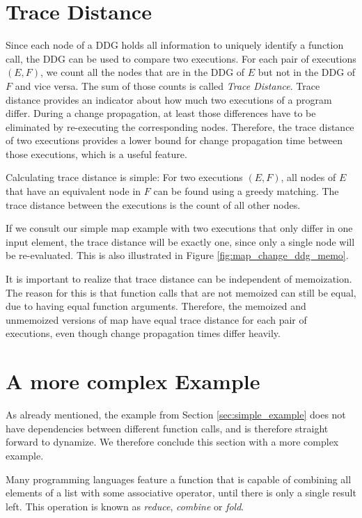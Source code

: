 \section{Trace Distance}
\label{sec:trace_distance}

Since each node of a DDG holds all information to uniquely identify a function call, the DDG can be used to compare two executions. For each pair of executions $(E, F)$, we count all the nodes that are in the DDG of $E$ but not in the DDG of $F$ and vice versa. The sum of those counts is called \textit{Trace Distance}. Trace distance provides an indicator about how much two executions of a program differ. During a change propagation, at least those differences have to be eliminated by re-executing the corresponding nodes. Therefore, the trace distance of two executions provides a lower bound for change propagation time between those executions, which is a useful feature. 

Calculating trace distance is simple: For two executions $(E, F)$, all nodes of $E$ that have an equivalent node in $F$ can be found using a greedy matching. The trace distance between the executions is the count of all other nodes. 

If we consult our simple map example with two executions that only differ in one input element, the trace distance will be exactly one, since only a single node will be re-evaluated. This is also illustrated in Figure \ref{fig:map_change_ddg_memo}.

It is important to realize that trace distance can be independent of memoization. The reason for this is that function calls that are not memoized can still be equal, due to having equal function arguments. Therefore, the memoized and unmemoized versions of map have equal trace distance for each pair of executions, even though change propagation times differ heavily.

\section{A more complex Example}
\label{sec:more_complex_example}

As already mentioned, the example from Section \ref{sec:simple_example} does not have dependencies between different function calls, and is therefore straight forward to dynamize. We therefore conclude this section with a more complex example. 

Many programming languages feature a function that is capable of combining all elements of a list with some associative operator, until there is only a single result left. This operation is known as \textit{reduce}, \textit{combine} or \textit{fold}.  

